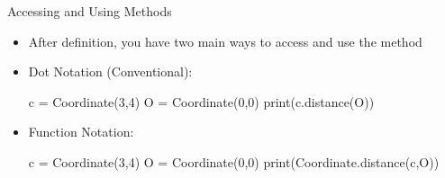 \documentclass[pdf, aspectratio=169, 12pt]{beamer}
\begin{document}
\begin{frame}[fragile]{Accessing and Using Methods}
	\begin{itemize}
		\item After definition, you have two main ways to access and use the method
	\end{itemize}
		\begin{itemize}
			\item \alert{Dot Notation (Conventional):}
			\begin{pythoncode}
				c = Coordinate(3,4)
				O = Coordinate(0,0)
				print(c.distance(O))
			\end{pythoncode}
			\item \alert{Function Notation:}
				\begin{pythoncode}
					c = Coordinate(3,4)
					O = Coordinate(0,0)
					print(Coordinate.distance(c,O))
				\end{pythoncode}
		\end{itemize}
\end{frame}
\end{document}
